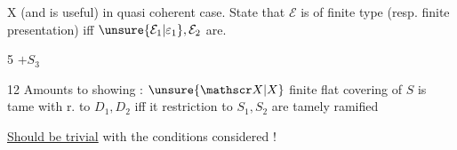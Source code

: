 
$\mathrm{X}$  \qquad {} (and is useful) in quasi coherent case. State that $\mathcal E$ is of finite type (resp. finite presentation)  iff $\unsure{\mathcal E_1|\varepsilon_1},\mathcal E_2$ are.


\margin{$\times$}5 \hfill $+S_3$

12 \qquad Amounts to showing : $\unsure{\mathscr X|X}$ finite flat covering of $S$ is tame with r. to $D_1,D_2$ iff it  restriction to $S_1,S_2$ are tamely ramified

\uline{Should be trivial} with the conditions considered !
